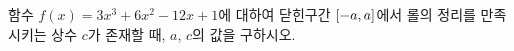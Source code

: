 함수 $f(x)=3x^3+6x^2-12x+1$에 대하여 닫힌구간 $[-a{,}\mkern3mu\mathopen{}a]$에서 롤의 정리를 만족시키는 상수 $c$가 존재할 때, $a$, $c$의 값을 구하시오. 
